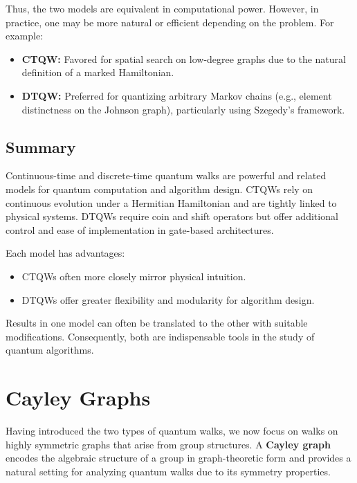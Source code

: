 \documentclass[12pt]{report}
\begin{document}
Thus, the two models are equivalent in computational power. However, in practice, one may be more natural or efficient depending on the problem. For example:
\begin{itemize}
    \item \textbf{CTQW:} Favored for spatial search on low-degree graphs due to the natural definition of a marked Hamiltonian.
    \item \textbf{DTQW:} Preferred for quantizing arbitrary Markov chains (e.g., element distinctness on the Johnson graph), particularly using Szegedy’s framework.
\end{itemize}

\subsection{Summary}

Continuous-time and discrete-time quantum walks are powerful and related models for quantum computation and algorithm design. CTQWs rely on continuous evolution under a Hermitian Hamiltonian and are tightly linked to physical systems. DTQWs require coin and shift operators but offer additional control and ease of implementation in gate-based architectures.

Each model has advantages:
\begin{itemize}
    \item CTQWs often more closely mirror physical intuition.
    \item DTQWs offer greater flexibility and modularity for algorithm design.
\end{itemize}

Results in one model can often be translated to the other with suitable modifications. Consequently, both are indispensable tools in the study of quantum algorithms.







\section{Cayley Graphs}



Having introduced the two types of quantum walks, we now focus on walks on highly symmetric graphs that arise from group structures. A \textbf{Cayley graph} encodes the algebraic structure of a group in graph-theoretic form and provides a natural setting for analyzing quantum walks due to its symmetry properties.
\end{document}
